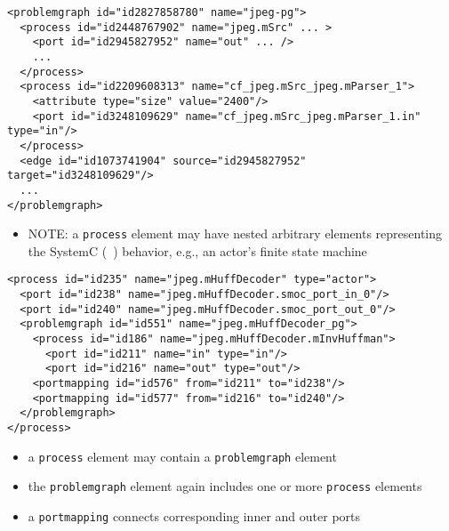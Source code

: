 \begin{frame}[fragile=singleslide]
\begin{lstlisting}
<problemgraph id="id2827858780" name="jpeg-pg">
  <process id="id2448767902" name="jpeg.mSrc" ... >
    <port id="id2945827952" name="out" ... />
    ...
  </process>
  <process id="id2209608313" name="cf_jpeg.mSrc_jpeg.mParser_1">
    <attribute type="size" value="2400"/>
    <port id="id3248109629" name="cf_jpeg.mSrc_jpeg.mParser_1.in" type="in"/>
  </process>
  <edge id="id1073741904" source="id2945827952" target="id3248109629"/>
  ...
</problemgraph>
\end{lstlisting}
\begin{itemize}
\item NOTE: a \lstinline|process| element may have nested arbitrary elements representing the SystemC (\SysteMoC\ ) behavior, e.g., an actor's finite state machine
\end{itemize}
\end{frame}


\begin{frame}[fragile=singleslide]
\begin{lstlisting}
<process id="id235" name="jpeg.mHuffDecoder" type="actor">
  <port id="id238" name="jpeg.mHuffDecoder.smoc_port_in_0"/>
  <port id="id240" name="jpeg.mHuffDecoder.smoc_port_out_0"/>
  <problemgraph id="id551" name="jpeg.mHuffDecoder_pg">
    <process id="id186" name="jpeg.mHuffDecoder.mInvHuffman">
      <port id="id211" name="in" type="in"/>
      <port id="id216" name="out" type="out"/>
    <portmapping id="id576" from="id211" to="id238"/>
    <portmapping id="id577" from="id216" to="id240"/>
  </problemgraph>
</process>
\end{lstlisting}
\begin{itemize}
\item a \lstinline|process| element may contain a \lstinline|problemgraph| element
\item the \lstinline|problemgraph| element again includes one or more \lstinline|process| elements
\item a \lstinline|portmapping| connects corresponding inner and outer ports 
\end{itemize}
\end{frame}


